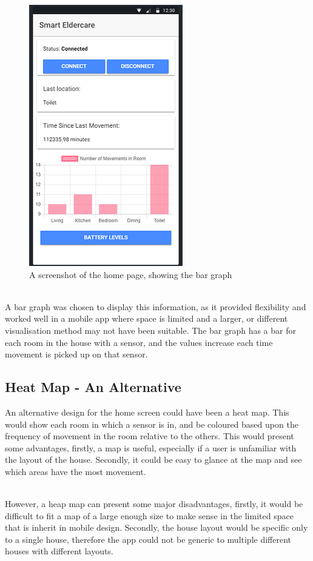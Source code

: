 \documentclass[a4paper, 11pt]{article}
\begin{document}
\begin{figure}
\includegraphics{home}
\caption{A screenshot of the home page, showing the bar graph \label{bat}}
\end{figure}


~\\
A bar graph was chosen to display this information, as it provided flexibility and worked well in a mobile app where space is limited and a larger, or different visualisation method may not have been suitable. The bar graph has a bar for each room in the house with a sensor, and the values increase each time movement is picked up on that sensor.


\subsection{Heat Map - An Alternative}

An alternative design for the home screen could have been a heat map. This would show each room in which a sensor is in, and be coloured based upon the frequency of movement in the room relative to the others. This would present some advantages, firstly, a map is useful, especially if a user is unfamiliar with the layout of the house. Secondly, it could be easy to glance at the map and see which areas have the most movement.

~\\
However, a heap map can present some major disadvantages, firstly, it would be difficult to fit a map of a large enough size to make sense in the limited space that is inherit in mobile design. Secondly, the house layout would be specific only to a single house, therefore the app could not be generic to multiple different houses with different layouts.
\end{document}
